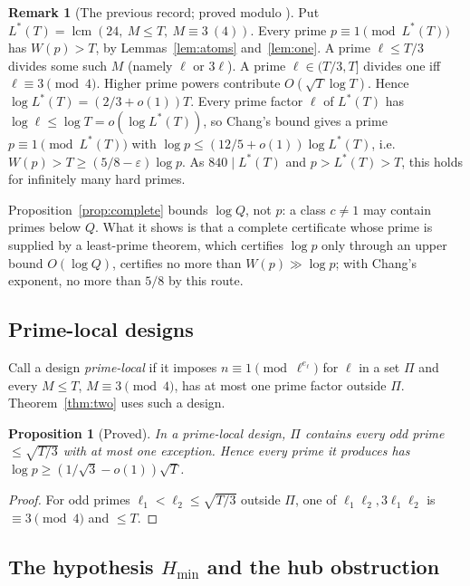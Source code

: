 \documentclass[11pt,reqno]{amsart}
\newtheorem{proposition}[theorem]{Proposition}
\theoremstyle{definition}
\newtheorem{remark}[theorem]{Remark}
\newcommand{\lcm}{\operatorname{lcm}}
\begin{document}
\begin{remark}[The previous record; proved modulo {\cite[Cor.~11]{Chang}}]\label{rem:record}
Put $L^*(T)=\lcm(24,\ M\le T,\ M\equiv3\ (4))$.  Every prime $p\equiv1\pmod{L^*(T)}$
has $W(p)>T$, by Lemmas~\ref{lem:atoms} and~\ref{lem:one}.  A prime
$\ell\le T/3$ divides some such $M$ (namely $\ell$ or $3\ell$).  A prime
$\ell\in(T/3,T]$ divides one iff $\ell\equiv3\pmod4$.  Higher prime powers
contribute $O(\sqrt T\log T)$.  Hence $\log L^*(T)=(2/3+o(1))T$.  Every prime
factor $\ell$ of $L^*(T)$ has $\log\ell\le\log T=o(\log L^*(T))$, so Chang's bound
gives a prime $p\equiv1\pmod{L^*(T)}$ with $\log p\le(12/5+o(1))\log L^*(T)$,
i.e.\ $W(p)>T\ge(5/8-\varepsilon)\log p$.  As $840\mid L^*(T)$ and $p>L^*(T)>T$,
this holds for infinitely many hard primes.

Proposition~\ref{prop:complete} bounds $\log Q$, not $p$: a class $c\ne1$ may
contain primes below $Q$.  What it shows is that a complete certificate whose
prime is supplied by a least-prime theorem, which certifies $\log p$ only
through an upper bound $O(\log Q)$, certifies no more than $W(p)\gg\log p$;
with Chang's exponent, no more than $5/8$ by this route.
\end{remark}

\subsection{Prime-local designs}

Call a design \emph{prime-local} if it imposes $n\equiv1\pmod{\ell^{e_\ell}}$ for
$\ell$ in a set $\Pi$ and every $M\le T$, $M\equiv3\pmod4$, has at most one prime
factor outside $\Pi$.  Theorem~\ref{thm:two} uses such a design.

\begin{proposition}[Proved]\label{prop:ceiling}
In a prime-local design, $\Pi$ contains every odd prime $\le\sqrt{T/3}$ with at
most one exception.  Hence every prime it produces has
$\log p\ge(1/\sqrt3-o(1))\sqrt T$.
\end{proposition}

\begin{proof}
For odd primes $\ell_1<\ell_2\le\sqrt{T/3}$ outside $\Pi$, one of
$\ell_1\ell_2,3\ell_1\ell_2$ is $\equiv3\pmod4$ and $\le T$.
\end{proof}

\subsection{The hypothesis \texorpdfstring{$H_{\min}$}{H\_min} and the hub obstruction}
\end{document}
